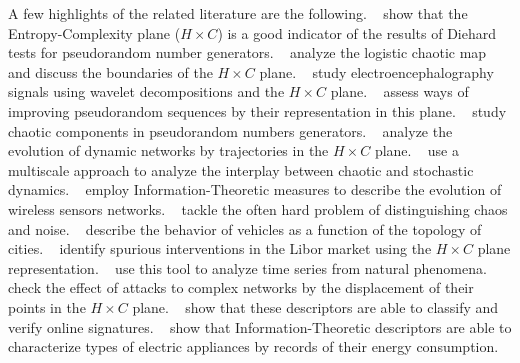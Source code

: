 \documentclass[sts]{imsart}
\begin{document}
A few highlights of the related literature are the following.
\citeauthor{RandomNumberGeneratorsCausality}~
show that the Entropy-Complexity plane ($H\times C$) is a good indicator of the results of Diehard tests for pseudorandom number generators.
\citeauthor{GeneralizedStatisticalComplexityMeasuresGeometricalAnalyticalProperties}~ analyze the logistic chaotic map and discuss the boundaries of the $H\times C$ plane.
\citeauthor{EEGAnalysisWaveletInformationTools}~ study electroencephalography signals using wavelet decompositions and the $H\times C$ plane.
\citeauthor{De_Micco_2008}~ assess ways of improving pseudorandom sequences by their representation in this plane.
\citeauthor{De_Micco_2009}~ study chaotic components in pseudorandom numbers generators.
\citeauthor{ComplexNetworksEvolution}~ analyze the evolution of dynamic networks by trajectories in the $H\times C$ plane.
\citeauthor{DistinguishingChaoticStochasticDynamicsTimeSeriesMultiscaleSymbolicApproach}~ use a multiscale approach to analyze the interplay between chaotic and stochastic dynamics.
\citeauthor{StructuralChangesDataCommunicationWSN}~ employ Information-Theoretic measures to describe the evolution of wireless sensors networks.
\citeauthor{DistinguishingNoiseFromChaos}~ tackle the often hard problem of distinguishing chaos and noise.
\citeauthor{CharacterizationVehicleBehaviorInformationTheory}~ describe the behavior of vehicles as a function of the topology of cities.
\citeauthor{LiborInvisibleHand}~ identify spurious interventions in the Libor market using the $H\times C$ plane representation.
\citeauthor{DiagnosingDynamicsObservedSimulatedEcosystem}~ use this tool to analyze time series from natural phenomena.
\citeauthor{InformationTheoryPerspectiveNetworkRobustness}~ check the effect of attacks to complex networks by the displacement of their points in the $H\times C$ plane.
\citeauthor{ClassificationVerificationOnlineHandwrittenSignatures}~ show that these descriptors are able to classify and verify online signatures.
\citeauthor{CharacterizationElectricLoadInformationTheoryQuantifiers}~
show that Information-Theoretic descriptors are able to characterize types of electric appliances by records of their energy consumption.
\end{document}
